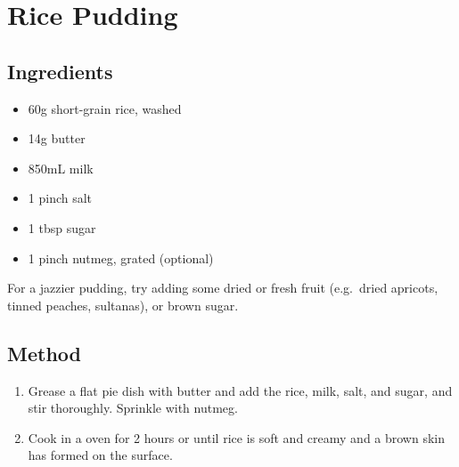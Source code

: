 \clearpage
\section{Rice Pudding}


\subsection{Ingredients}

\begin{itemize}
    \item 60g short-grain rice, washed
    \item 14g butter
    \item 850mL milk
    \item 1 pinch salt
    \item 1 tbsp sugar
    \item 1 pinch nutmeg, grated (optional)
\end{itemize}

For a jazzier pudding, try adding some dried or fresh fruit (e.g.\ dried apricots, tinned peaches, sultanas), or brown sugar.

\subsection{Method}

\begin{enumerate}
    \item Grease a flat pie dish with butter and add the rice, milk, salt, and sugar, and stir thoroughly. Sprinkle with nutmeg.
    \item Cook in a  oven for 2 hours or until rice is soft and creamy and a brown skin has formed on the surface.
\end{enumerate}
